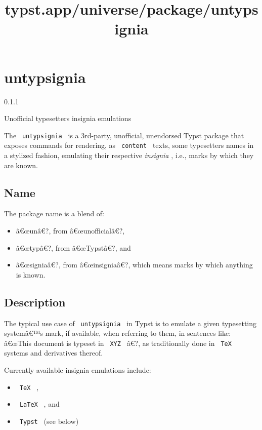 \title{typst.app/universe/package/untypsignia}

\label{banner}
\section{untypsignia}\label{untypsignia}

{ 0.1.1 }

Unofficial typesetter\textquotesingle s insignia emulations

\label{readme}
The \texttt{\ untypsignia\ } is a 3rd-party, unofficial, unendorsed
Typst package that exposes commands for rendering, as
\texttt{\ content\ } texts, some typesetters names in a stylized
fashion, emulating their respective \emph{insignia} , i.e., marks by
which they are known.

\subsection{Name}\label{name}

The package name is a blend of:

\begin{itemize}
\tightlist
\item
  â€œunâ€?, from â€œunofficialâ€?,
\item
  â€œtypâ€?, from â€œTypstâ€?, and
\item
  â€œsigniaâ€?, from â€œinsigniaâ€?, which means marks by which anything
  is known.
\end{itemize}

\subsection{Description}\label{description}

The typical use case of \texttt{\ untypsignia\ } in Typst is to emulate
a given typesetting systemâ€™s mark, if available, when referring to
them, in sentences like: â€œThis document is typeset in \texttt{\ XYZ\ }
â€?, as traditionally done in \texttt{\ TeX\ } systems and derivatives
thereof.

Currently available insignia emulations include:

\begin{itemize}
\tightlist
\item
  \texttt{\ TeX\ } ,
\item
  \texttt{\ LaTeX\ } , and
\item
  \texttt{\ Typst\ } (see below)
\end{itemize}


